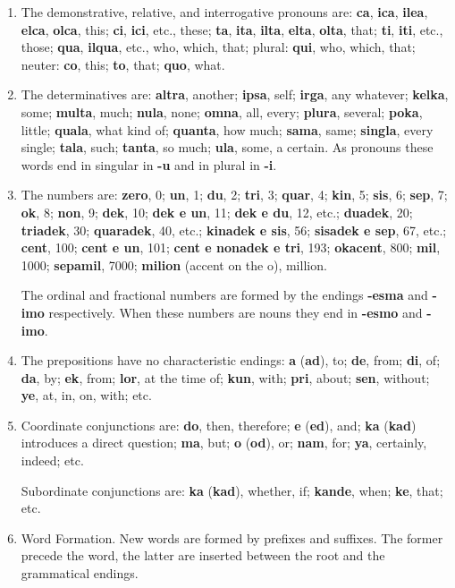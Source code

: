 \begin{enumerate}
    \item The demonstrative, relative, and interrogative pronouns are: \textbf{ca}, \textbf{ica}, \textbf{ilea}, \textbf{elca}, \textbf{olca}, this; \textbf{ci}, \textbf{ici}, etc., these; \textbf{ta}, \textbf{ita}, \textbf{ilta}, \textbf{elta}, \textbf{olta}, that; \textbf{ti}, \textbf{iti}, etc., those; \textbf{qua}, \textbf{ilqua}, etc., who, which, that; plural: \textbf{qui}, who, which, that; neuter: \textbf{co}, this; \textbf{to}, that; \textbf{quo}, what. 
    \item The determinatives are: \textbf{altra}, another; \textbf{ipsa}, self; \textbf{irga}, any whatever; \textbf{kelka}, some; \textbf{multa}, much; \textbf{nula}, none; \textbf{omna}, all, every; \textbf{plura}, several; \textbf{poka}, little; \textbf{quala}, what kind of; \textbf{quanta}, how much; \textbf{sama}, same; \textbf{singla}, every single; \textbf{tala}, such; \textbf{tanta}, so much; \textbf{ula}, some, a certain. As pronouns these words end in singular in \textbf{-u} and in plural in \textbf{-i}. 
    \item The numbers are: \textbf{zero}, 0; \textbf{un}, 1; \textbf{du}, 2; \textbf{tri}, 3; \textbf{quar}, 4; \textbf{kin}, 5; \textbf{sis}, 6; \textbf{sep}, 7; \textbf{ok}, 8; \textbf{non}, 9; \textbf{dek}, 10; \textbf{dek e un}, 11; \textbf{dek e du}, 12, etc.; \textbf{duadek}, 20; \textbf{triadek}, 30; \textbf{quaradek}, 40, etc.; \textbf{kinadek e sis}, 56; \textbf{sisadek e sep}, 67, etc.; \textbf{cent}, 100; \textbf{cent e un}, 101; \textbf{cent e nonadek e tri}, 193; \textbf{okacent}, 800; \textbf{mil}, 1000; \textbf{sepamil}, 7000; \textbf{milion} (accent on the o), million.
    
    The ordinal and fractional numbers are formed by the endings \textbf{-esma} and \textbf{-imo} respectively. When these numbers are nouns they end in \textbf{-esmo} and \textbf{-imo}. 
    \item The prepositions have no characteristic endings: \textbf{a} (\textbf{ad}), to; \textbf{de}, from; \textbf{di}, of; \textbf{da}, by; \textbf{ek}, from; \textbf{lor}, at the time of; \textbf{kun}, with; \textbf{pri}, about; \textbf{sen}, without; \textbf{ye}, at, in, on, with; etc. 
    \item Coordinate conjunctions are: \textbf{do}, then, therefore; \textbf{e} (\textbf{ed}), and; \textbf{ka} (\textbf{kad}) introduces a direct question; \textbf{ma}, but; \textbf{o} (\textbf{od}), or; \textbf{nam}, for; \textbf{ya}, certainly, indeed; etc.
    
    Subordinate conjunctions are: \textbf{ka} (\textbf{kad}), whether, if; \textbf{kande}, when; \textbf{ke}, that; etc. 
    \item Word Formation. New words are formed by prefixes and suffixes. The former precede the word, the latter are inserted between the root and the grammatical endings. 
\end{enumerate}
